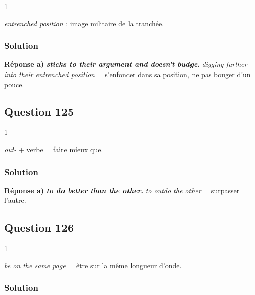 \documentclass[11pt,a4paper]{article}
\begin{document}
\begin{indication}{1}

\emph{entrenched position} : image militaire de la tranchée.

\end{indication}

\hypertarget{solution-123}{%
\subsubsection{Solution}\label{solution-123}}

\textbf{Réponse a) \emph{sticks to their argument and doesn't budge}.} \emph{digging further into their entrenched position} = s'enfoncer dans sa position, ne pas bouger d'un pouce.

\hypertarget{question-125}{%
\subsection{Question 125}\label{question-125}}

\begin{indication}{1}

\emph{out-} + verbe = faire mieux que.

\end{indication}

\hypertarget{solution-124}{%
\subsubsection{Solution}\label{solution-124}}

\textbf{Réponse a) \emph{to do better than the other}.} \emph{to outdo the other} = surpasser l'autre.

\hypertarget{question-126}{%
\subsection{Question 126}\label{question-126}}

\begin{indication}{1}

\emph{be on the same page} = être sur la même longueur d'onde.

\end{indication}

\hypertarget{solution-125}{%
\subsubsection{Solution}\label{solution-125}}
\end{document}
